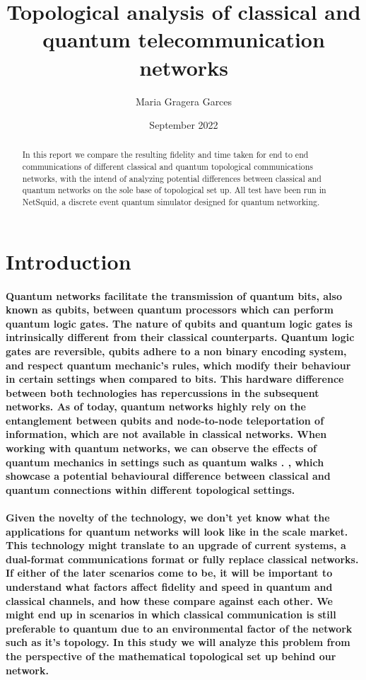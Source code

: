 \documentclass{article}
\begin{document}
    
\title{Topological analysis of classical and quantum telecommunication networks}
\author{Maria Gragera Garces}

\date{September 2022}

\maketitle

\begin{abstract}
    In this report we compare the resulting fidelity and time taken for end to end communications of different classical and quantum topological communications networks, with the intend of analyzing potential differences between classical and quantum networks on the sole base of topological set up.
    All test have been run in NetSquid, a discrete event quantum simulator designed for quantum networking.
    \end{abstract}

\section{Introduction}

\paragraph{Quantum networks facilitate the transmission of quantum bits, also known as qubits, between quantum processors which can perform quantum logic gates.
The nature of qubits and quantum logic gates is intrinsically different from their classical counterparts. Quantum logic gates are reversible, qubits adhere to a non binary encoding system, and respect quantum mechanic's rules, which modify their behaviour in certain settings when compared to bits.
This hardware difference between both technologies has repercussions in the subsequent networks. As of today, quantum networks highly rely on the entanglement between qubits and node-to-node teleportation of information, which are not available in classical networks.
When working with quantum networks, we can observe the effects of quantum mechanics in settings such as quantum walks \cite{Quantumwalks}. , which showcase a potential behavioural difference between classical and quantum connections within different topological settings.}


\paragraph{Given the novelty of the technology, we don't yet know what the applications for quantum networks will look like in the scale market. This technology might translate to an upgrade of current systems, a dual-format communications format or fully replace classical networks. 
If either of the later scenarios come to be, it will be important to understand what factors affect fidelity and speed in quantum and classical channels, and how these compare against each other. We might end up in scenarios in which classical communication is still preferable to quantum due to an environmental factor of the network such as it's topology.
In this study we will analyze this problem from the perspective of the mathematical topological set up behind our network.}
\end{document}
